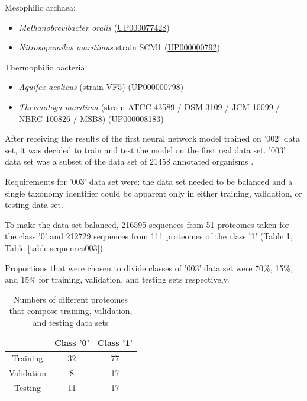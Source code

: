 \documentclass[12pt]{article}
\begin{document}
	\vspace*{0.5cm}

	Mesophilic archaea:

	\begin{itemize}
		\item \textit{Methanobrevibacter oralis} 
		(\href{https://www.uniprot.org/proteomes/UP000077428}{UP000077428})
		\item \textit{Nitrosopumilus maritimus} strain SCM1 (\href{https://www.uniprot.org/proteomes/UP000000792}{UP000000792})
	\end{itemize}

	Thermophilic bacteria:

	\begin{itemize}
		\item \textit{Aquifex aeolicus} (strain VF5)
		(\href{https://www.uniprot.org/proteomes/UP000000798}{UP000000798})
		\item \textit{Thermotoga maritima} 
		(strain ATCC 43589 / DSM 3109 / JCM 10099 / NBRC 100826 / MSB8) 
		(\href{https://www.uniprot.org/proteomes/UP000008183}{UP000008183})
	\end{itemize}

	After receiving the results of the first neural network model trained on 
	'002' data set, it was decided to train and test the model on the first 
	real data set. '003' data set was a subset of the data set of 21458 
	annotated organisms \cite{engqvist_martin_karl_magnus_2018_1175609}. 
	
	Requirements for '003' data set were: the data set needed to be balanced and a
	single taxonomy identifier could be apparent only in either training, validation,
	or testing data set. 
	
	To make the data set balanced, 216595 sequences from 51 proteomes taken 
	for the class '0' and 212729 sequences from 111 proteomes of the class '1' 
	(Table \ref{table:proteomes003}, Table \ref{table:sequences003}).

	Proportions that were chosen to divide classes of '003'
	data set were 70\%, 15\%, and 15\% for training, validation, and testing
	sets respectively.

	\begin{table}[h!]
		\caption{Numbers of different proteomes that compose training, 
		validation, and testing data sets}
		\vspace{0.2cm}
		\centering
		\begin{tabular}{ | c c c | }
			\hline
			& Class '0' & Class '1' \\
			\hline
			Training & 32 & 77 \\ 
			Validation & 8 & 17 \\
			Testing & 11 & 17 \\
			\hline   
		\end{tabular}
		\label{table:proteomes003}
	\end{table}
\end{document}
